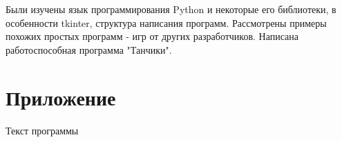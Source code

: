 \documentclass[14pt, oneside]{altsu-report}
\begin{document}
Были изучены язык программирования Python и некоторые его библиотеки, в особенности tkinter, структура написания программ. Рассмотрены примеры похожих простых программ - игр от других разработчиков. Написана работоспособная программа "Танчики".

\newpage
{}
\printbibliography[title={Список использованных источников}]

\appendix
\newpage
\chapter*{\raggedleft\label{appendix1}Приложение}

\begin{center}
\label{code:appendix}Текст программы
\end{center}

\begin{code}
\vspace{-1cm}\inputminted{Python}{src/main.py}
\end{code}
\end{document}

